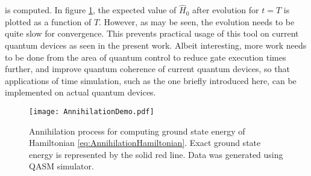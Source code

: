 \noindent is computed. In figure \ref{fig:AnnihilationProcess}, the expected value of $\hat{H}_0$ after evolution for $t=T$ is plotted as a function of $T$. However, as may be seen, the evolution needs to be quite slow for convergence. This prevents practical usage of this tool on current quantum devices as seen in the present work. Albeit interesting, more work needs to be done from the area of quantum control to reduce gate execution times further, and improve quantum coherence of current quantum devices, so that applications of time simulation, such as the one briefly introduced here, can be implemented on actual quantum devices.

\begin{figure}
    \centering
    \texttt{[image: AnnihilationDemo.pdf]}
    \caption{Annihilation process for computing ground state energy of Hamiltonian \ref{eq:AnnihilationHamiltonian}. Exact ground state energy is represented by the solid red line. Data was generated using QASM simulator.}
    \label{fig:AnnihilationProcess}
\end{figure}